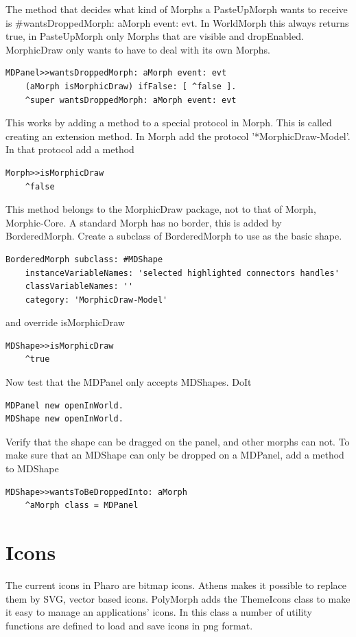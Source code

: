 \documentclass[10pt]{article}   	%
\begin{document}
The method that decides what kind of Morphs a PasteUpMorph wants 
to receive is \#wantsDroppedMorph: aMorph event: evt. In WorldMorph this
always returns true, in PasteUpMorph only Morphs that are visible and
dropEnabled. MorphicDraw only wants to have to deal with its own 
Morphs. 
\begin{verbatim}
MDPanel>>wantsDroppedMorph: aMorph event: evt
    (aMorph isMorphicDraw) ifFalse: [ ^false ].
    ^super wantsDroppedMorph: aMorph event: evt
\end{verbatim}
This works by adding a method to a special protocol in Morph.
This is called creating an extension method.
In Morph add the protocol '*MorphicDraw-Model'.
In that protocol add a method
\begin{verbatim}
Morph>>isMorphicDraw
    ^false
\end{verbatim}
This method belongs to the MorphicDraw package, not to 
that of Morph, Morphic-Core.
A standard Morph has no border, this is added by BorderedMorph.
Create a subclass of BorderedMorph to use as the basic shape.
\begin{verbatim}
BorderedMorph subclass: #MDShape
    instanceVariableNames: 'selected highlighted connectors handles'
    classVariableNames: ''
    category: 'MorphicDraw-Model'
\end{verbatim}
and override isMorphicDraw
\begin{verbatim}
MDShape>>isMorphicDraw
    ^true
\end{verbatim}
Now test that the MDPanel only accepts MDShapes. 
DoIt
\begin{verbatim}
MDPanel new openInWorld.
MDShape new openInWorld.
\end{verbatim}
Verify that the shape can be dragged on the panel, and other morphs can not.
To make sure that an MDShape can only be dropped on a MDPanel,
add a method to MDShape
\begin{verbatim}
MDShape>>wantsToBeDroppedInto: aMorph
    ^aMorph class = MDPanel
\end{verbatim}

\section{Icons\label{Icons}}
The current icons in Pharo are bitmap icons. Athens makes it possible
to replace them by SVG, vector based icons. PolyMorph adds the 
ThemeIcons class to make it easy to manage an applications' icons.
In this class a number of utility functions are defined to load and save
icons in png format. 
\end{document}

